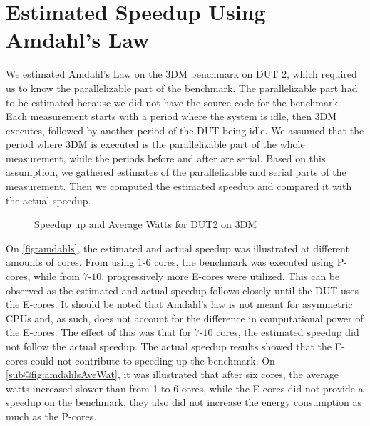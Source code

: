 \section{Estimated Speedup Using Amdahl's Law}\label{app:Amdahls}


We estimated Amdahl's Law on the 3DM benchmark on DUT 2, which required us to know the parallelizable part of the benchmark. The parallelizable part had to be estimated because we did not have the source code for the benchmark. Each measurement starts with a period where the system is idle, then 3DM executes, followed by another period of the DUT being idle. We assumed that the period where 3DM is executed is the parallelizable part of the whole measurement, while the periods before and after are serial. Based on this assumption, we gathered estimates of the parallelizable and serial parts of the measurement. Then we computed the estimated speedup and compared it with the actual speedup.

\begin{figure}[H]
    \centering
    \begin{subfigure}[t]{0.4\textwidth}
        \centering
        
    \end{subfigure}
    \hspace{2cm}
    \begin{subfigure}[t]{0.4\textwidth}
        \centering
        
    \end{subfigure}
    \caption{Speedup up and Average Watts for DUT2 on 3DM}
\end{figure}
%
%

On \cref{fig:amdahls}, the estimated and actual speedup was illustrated at different amounts of cores. From using $1$-$6$ cores, the benchmark was executed using P-cores, while from $7$-$10$, progressively more E-cores were utilized. This can be observed as the estimated and actual speedup follows closely until the DUT uses the E-cores. It should be noted that Amdahl's law is not meant for asymmetric CPUs and, as such, does not account for the difference in computational power of the E-cores. The effect of this was that for $7$-$10$ cores, the estimated speedup did not follow the actual speedup. The actual speedup results showed that the E-cores could not contribute to speeding up the benchmark. On \cref{sub@fig:amdahlsAveWat}, it was illustrated that after six cores, the average watts increased slower than from 1 to 6 cores, while the E-cores did not provide a speedup on the benchmark, they also did not increase the energy consumption as much as the P-cores. 

